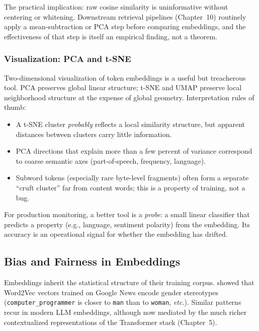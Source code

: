 The practical implication: raw cosine similarity is uninformative
without centering or whitening. Downstream retrieval pipelines
(Chapter~10) routinely apply a mean-subtraction or PCA step before
comparing embeddings, and the effectiveness of that step is itself an
empirical finding, not a theorem.

\subsubsection{Visualization: PCA and t-SNE}

Two-dimensional visualization of token embeddings is a useful but
treacherous tool. PCA preserves global linear structure; t-SNE and
UMAP preserve local neighborhood structure at the expense of global
geometry. Interpretation rules of thumb:
\begin{itemize}
  \item A t-SNE cluster \emph{probably} reflects a local similarity
        structure, but apparent distances between clusters carry
        little information.
  \item PCA directions that explain more than a few percent of
        variance correspond to coarse semantic axes
        (part-of-speech, frequency, language).
  \item Subword tokens (especially rare byte-level fragments) often
        form a separate ``cruft cluster'' far from content words;
        this is a property of training, not a bug.
\end{itemize}
For production monitoring, a better tool is a \emph{probe}: a small
linear classifier that predicts a property (e.g., language, sentiment
polarity) from the embedding. Its accuracy is an operational signal
for whether the embedding has drifted.

\subsection{Bias and Fairness in Embeddings}

Embeddings inherit the statistical structure of their training
corpus. \citet{bolukbasi2016man} showed that Word2Vec vectors
trained on Google News encode gender stereotypes
(\texttt{computer\_programmer} is closer to \texttt{man} than to
\texttt{woman}, \emph{etc.}). Similar patterns recur in modern LLM
embeddings, although now mediated by the much richer contextualized
representations of the Transformer stack (Chapter~5).

